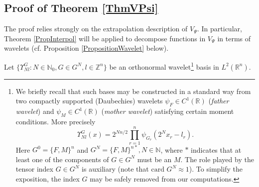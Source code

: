 \documentclass[11pt, a4paper,leqno]{amsart}
\theoremstyle{plain}
\numberwithin{equation}{section}
\theoremstyle{definition}
\newtheorem{definition}{Definition}
\theoremstyle{remark}
\def\R{\mathbb{R}}
\begin{document}
\subsection{Proof of Theorem \ref{ThmVPsi}\label{SecThm1}}

The proof relies strongly on the extrapolation
description of $V_{\Psi}$. In particular, Theorem \ref{PropInterpol} will be
applied to decompose functions in $V_{\Psi}$ in terms of wavelets (cf.
Proposition \ref{PropositionWavelet} below).
%
%
 
 
 Let $\{\Upsilon^G_{N l}: N \in \mathbb{N}_0, G \in G^N, l \in \mathbb{Z}^n\}$ be an orthonormal wavelet\footnote{We briefly recall that such bases may be constructed in a standard way from two compactly supported (Daubechies) wavelets $\psi_F \in C^1(\R)$ (\emph{father wavelet}) and $\psi_M \in C^1(\R)$ (\emph{mother wavelet}) satisfying certain moment conditions. More precisely
 $$
 	\Upsilon^G_{N l} (x) = 2^{N n/2} \prod_{r=1}^n \psi_{G_r} (2^N x_r-l_r).
 $$
 Here $G^0 = \{F, M\}^n$ and $G^N = \{F, M\}^{n*}, N \in \mathbb{N}$, where $*$ indicates that at least one of the components of $G \in G^N$ must be an $M$. The role played by
the tensor index $G \in G^{N}$ is auxiliary (note that $\text{card } G^{N}
\approx1$). To simplify the exposition, the index $G$ may be
safely removed from our computations.}  basis in $L^2(\R^n)$.
  
\end{document}
